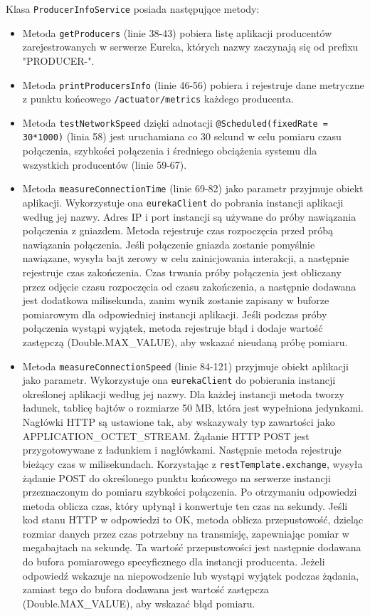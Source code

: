 Klasa \verb|ProducerInfoService| posiada następujące metody:
\begin{itemize}
    \item Metoda \verb|getProducers| (linie 38-43) pobiera listę aplikacji producentów zarejestrowanych w serwerze Eureka, których nazwy zaczynają się od prefixu "PRODUCER-".
    \item Metoda \verb|printProducersInfo| (linie 46-56) pobiera i rejestruje dane metryczne z punktu końcowego \verb|/actuator/metrics| każdego producenta.
    \item Metoda \verb|testNetworkSpeed| dzięki adnotacji \verb|@Scheduled(fixedRate = 30*1000)| (linia 58) jest uruchamiana co 30 sekund w celu pomiaru czasu połączenia, szybkości połączenia i średniego obciążenia systemu dla wszystkich producentów (linie 59-67).
    \item Metoda \verb|measureConnectionTime| (linie 69-82) jako parametr przyjmuje obiekt aplikacji. Wykorzystuje ona \verb|eurekaClient| do pobrania instancji aplikacji według jej nazwy. Adres IP i port instancji są używane do próby nawiązania połączenia z gniazdem. Metoda rejestruje czas rozpoczęcia przed próbą nawiązania połączenia. Jeśli połączenie gniazda zostanie pomyślnie nawiązane, wysyła bajt zerowy w celu zainicjowania interakcji, a następnie rejestruje czas zakończenia. Czas trwania próby połączenia jest obliczany przez odjęcie czasu rozpoczęcia od czasu zakończenia, a następnie dodawana jest dodatkowa milisekunda, zanim wynik zostanie zapisany w buforze pomiarowym dla odpowiedniej instancji aplikacji. Jeśli podczas próby połączenia wystąpi wyjątek, metoda rejestruje błąd i dodaje wartość zastępczą (Double.MAX\_VALUE), aby wskazać nieudaną próbę pomiaru.
    \item Metoda \verb|measureConnectionSpeed| (linie 84-121) przyjmuje obiekt aplikacji jako parametr. Wykorzystuje ona \verb|eurekaClient| do pobierania instancji określonej aplikacji według jej nazwy. Dla każdej instancji metoda tworzy ładunek, tablicę bajtów o rozmiarze 50 MB, która jest wypełniona jedynkami. Nagłówki HTTP są ustawione tak, aby wskazywały typ zawartości jako APPLICATION\_OCTET\_STREAM. Żądanie HTTP POST jest przygotowywane z ładunkiem i nagłówkami. Następnie metoda rejestruje bieżący czas w milisekundach. Korzystając z \verb|restTemplate.exchange|, wysyła żądanie POST do określonego punktu końcowego na serwerze instancji przeznaczonym do pomiaru szybkości połączenia. Po otrzymaniu odpowiedzi metoda oblicza czas, który upłynął i konwertuje ten czas na sekundy. Jeśli kod stanu HTTP w odpowiedzi to OK, metoda oblicza przepustowość, dzieląc rozmiar danych przez czas potrzebny na transmisję, zapewniając pomiar w megabajtach na sekundę. Ta wartość przepustowości jest następnie dodawana do bufora pomiarowego specyficznego dla instancji producenta. Jeżeli odpowiedź wskazuje na niepowodzenie lub wystąpi wyjątek podczas żądania, zamiast tego do bufora dodawana jest wartość zastępcza (Double.MAX\_VALUE), aby wskazać błąd pomiaru.

\end{itemize}
